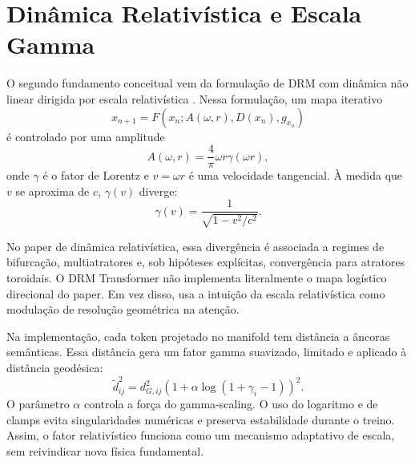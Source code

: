 \section{Dinâmica Relativística e Escala Gamma}
\label{sec:relativistica}

O segundo fundamento conceitual vem da formulação de DRM com dinâmica não
linear dirigida por escala relativística \cite{muniz_relativistic_drm}. Nessa
formulação, um mapa iterativo
\begin{equation}
  x_{n+1}=F(x_n; A(\omega,r), D(x_n), g_{x_n})
\end{equation}
é controlado por uma amplitude
\begin{equation}
  A(\omega,r) = \frac{4}{\pi}\omega r \gamma(\omega r),
\end{equation}
onde $\gamma$ é o fator de Lorentz e $v=\omega r$ é uma velocidade tangencial.
À medida que $v$ se aproxima de $c$, $\gamma(v)$ diverge:
\begin{equation}
  \gamma(v)=\frac{1}{\sqrt{1-v^2/c^2}}.
\end{equation}

No paper de dinâmica relativística, essa divergência é associada a regimes de
bifurcação, multiatratores e, sob hipóteses explícitas, convergência para
atratores toroidais. O DRM Transformer não implementa literalmente o mapa
logístico direcional do paper. Em vez disso, usa a intuição da escala
relativística como modulação de resolução geométrica na atenção.

Na implementação, cada token projetado no manifold tem distância a âncoras
semânticas. Essa distância gera um fator gamma suavizado, limitado e aplicado à
distância geodésica:
\begin{equation}
  \tilde{d}_{ij}^2 = d_{G,ij}^2
    \left(1+\alpha \log(1+\gamma_i-1)\right)^2.
\end{equation}
O parâmetro $\alpha$ controla a força do gamma-scaling. O uso do logaritmo e de
clamps evita singularidades numéricas e preserva estabilidade durante o treino.
Assim, o fator relativístico funciona como um mecanismo adaptativo de escala,
sem reivindicar nova física fundamental.
